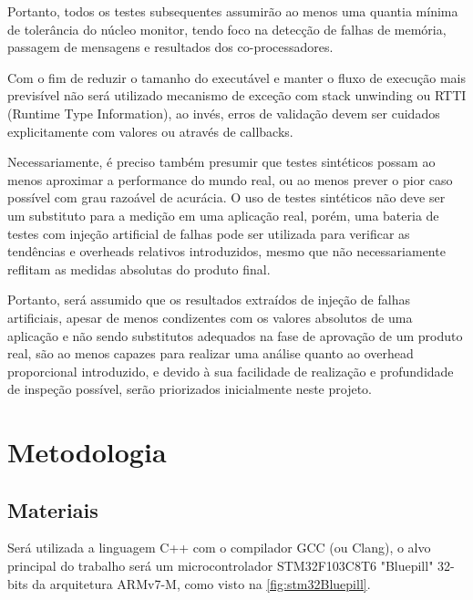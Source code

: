 Portanto, todos os testes subsequentes assumirão ao menos uma quantia mínima de tolerância do núcleo monitor, tendo foco na detecção de falhas de memória, passagem de mensagens e resultados dos co-processadores.

Com o fim de reduzir o tamanho do executável e manter o fluxo de execução mais previsível não será utilizado mecanismo de exceção com stack unwinding ou RTTI (Runtime Type Information), ao invés, erros de validação devem ser cuidados explicitamente com valores ou através de callbacks.

Necessariamente, é preciso também presumir que testes sintéticos possam ao menos aproximar a performance do mundo real, ou ao menos prever o pior caso possível com grau razoável de acurácia. O uso de testes sintéticos não deve ser um substituto para a medição em uma aplicação real, porém, uma bateria de testes com injeção artificial de falhas pode ser utilizada para verificar as tendências e overheads relativos introduzidos, mesmo que não necessariamente reflitam as medidas absolutas do produto final.

Portanto, será assumido que os resultados extraídos de injeção de falhas artificiais, apesar de menos condizentes com os valores absolutos de uma aplicação e não sendo substitutos adequados na fase de aprovação de um produto real, são ao menos capazes para realizar uma análise quanto ao overhead proporcional introduzido, e devido à sua facilidade de realização e profundidade de inspeção possível, serão priorizados inicialmente neste projeto.

\section{Metodologia}

\subsection{Materiais}


Será utilizada a linguagem C++ com o compilador GCC (ou Clang), o alvo principal do trabalho será um microcontrolador STM32F103C8T6 "Bluepill" 32-bits da arquitetura ARMv7-M, como visto na \autoref{fig:stm32Bluepill}.

